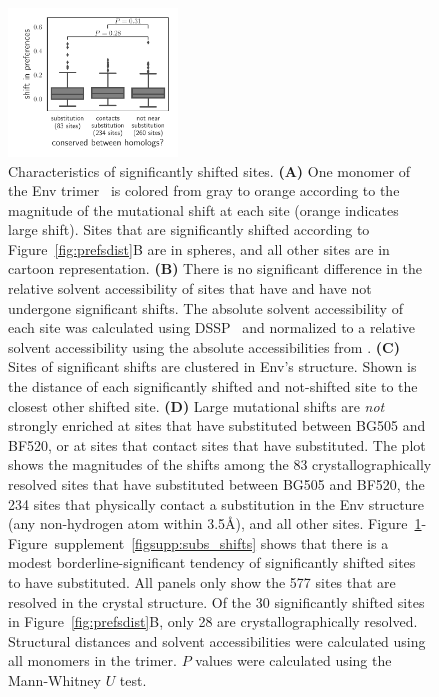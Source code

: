 \documentclass[9pt]{elife}
\newcommand{\angstrom}{\textup{\AA}}
\begin{document}
\begin{figure}
\hspace{0.01\textwidth}
\includegraphics[width=0.4\textwidth]{figures/conservation_vs_shifts.pdf} 
\caption{\label{fig:shiftfeatures}
Characteristics of significantly shifted sites.
{\bf (A)} One monomer of the Env trimer~\citep[PDB 5FYL;][]{stewart2016trimeric} is colored from gray to orange according to the magnitude of the mutational shift at each site (orange indicates large shift).
Sites that are significantly shifted according to Figure~\ref{fig:prefsdist}B are in spheres, and all other sites are in cartoon representation.
{\bf (B)} 
There is no significant difference in the relative solvent accessibility of sites that have and have not undergone significant shifts.
The absolute solvent accessibility of each site was calculated using DSSP~\citep{kabsch1983dictionary} and normalized to a relative solvent accessibility using the absolute accessibilities from \citet{tien2013maximum}.
{\bf (C)} 
Sites of significant shifts are clustered in Env's structure.
Shown is the distance of each significantly shifted and not-shifted site to the closest other shifted site.
{\bf (D)}
Large mutational shifts are \emph{not} strongly enriched at sites that have substituted between BG505 and BF520, or at sites that contact sites that have substituted. 
The plot shows the magnitudes of the shifts among the 83 crystallographically resolved sites that have substituted between BG505 and BF520, the 234 sites that physically contact a substitution in the Env structure (any non-hydrogen atom within 3.5\angstrom), and all other sites.
Figure~\ref{fig:shiftfeatures}-Figure~supplement~\ref{figsupp:subs_shifts} shows that there is a modest borderline-significant tendency of significantly shifted sites to have substituted.
All panels only show the 577 sites that are resolved in the crystal structure.
Of the 30 significantly shifted sites in Figure~\ref{fig:prefsdist}B, only 28 are crystallographically resolved.
Structural distances and solvent accessibilities were calculated using all monomers in the trimer.
$P$ values were calculated using the Mann-Whitney $U$ test.
}
{}
\end{figure}
\end{document}
